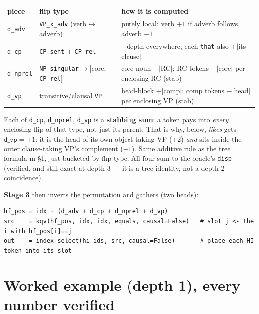 \documentclass[11pt]{article}
\newcommand{\head}[1]{\textcolor{headc}{#1}}
\newcommand{\code}[1]{\texttt{#1}}
\begin{document}
\begin{center}\footnotesize
\begin{tabular}{@{}lll@{}}
\toprule
piece & flip type & how it is computed\\
\midrule
\code{d\_adv}   & \code{VP\_x\_adv} (verb$\leftrightarrow$adverb) & purely local: verb $+1$ if adverb follows, adverb $-1$\\
\code{d\_cp}    & \code{CP\_sent} $+$ \code{CP\_rel}              & $-\text{depth}$ everywhere; each \code{that} also $+|$its clause$|$\\
\code{d\_nprel} & \code{NP\_singular}$\to$[core, \code{CP\_rel}]  & core noun $+|$RC$|$; RC tokens $-|$core$|$ per enclosing RC (stab)\\
\code{d\_vp}    & transitive/clausal \code{VP}                   & head-block $+|$comp$|$; comp tokens $-|$head$|$ per enclosing VP (stab)\\
\bottomrule
\end{tabular}
\end{center}

\begin{keybox}
Each of \code{d\_cp}, \code{d\_nprel}, \code{d\_vp} is a \textbf{stabbing sum}: a token pays into
\emph{every} enclosing flip of that type, not just its parent. That is why, below, \emph{likes}
gets $\code{d\_vp}=+1$: it is the \head{head} of its own object-taking VP ($+2$) \emph{and} sits
inside the outer clause-taking VP's complement ($-1$). Same additive rule as the tree formula in
\S1, just bucketed by flip type. All four sum to the oracle's \code{disp} (verified, and still exact
at depth 3 --- it is a tree identity, not a depth-2 coincidence).
\end{keybox}

\noindent \textbf{Stage 3} then inverts the permutation and gathers (two heads):
\begin{lstlisting}
hf_pos = idx + (d_adv + d_cp + d_nprel + d_vp)
src    = kqv(hf_pos, idx, idx, equals, causal=False)   # slot j <- the i with hf_pos[i]==j
out    = index_select(hi_ids, src, causal=False)       # place each HI token into its slot
\end{lstlisting}

\section{Worked example (depth 1), every number verified}
\end{document}
